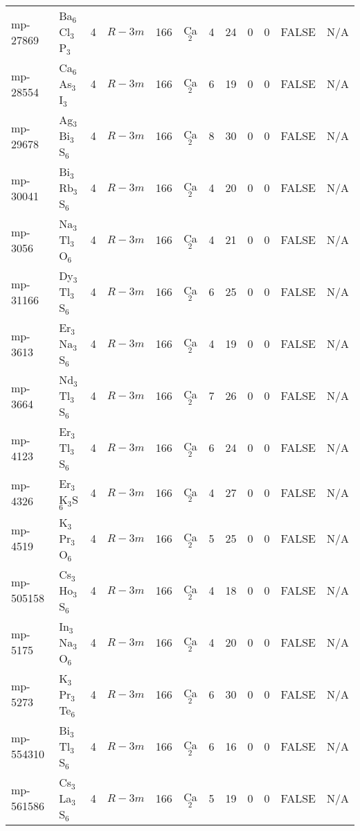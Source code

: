 {\begin{longtable}{llcccccccccc}
    mp-27869 & Ba$_{6}$Cl$_{3}$P$_{3}$ & 4     & $R-3m$ & 166   & Ca$_{2}$ & 4     & 24    & 0     & 0     & FALSE & N/A \\
    mp-28554 & Ca$_{6}$As$_{3}$I$_{3}$ & 4     & $R-3m$ & 166   & Ca$_{2}$ & 6     & 19    & 0     & 0     & FALSE & N/A \\
    mp-29678 & Ag$_{3}$Bi$_{3}$S$_{6}$ & 4     & $R-3m$ & 166   & Ca$_{2}$ & 8     & 30    & 0     & 0     & FALSE & N/A \\
    mp-30041 & Bi$_{3}$Rb$_{3}$S$_{6}$ & 4     & $R-3m$ & 166   & Ca$_{2}$ & 4     & 20    & 0     & 0     & FALSE & N/A \\
    mp-3056 & Na$_{3}$Tl$_{3}$O$_{6}$ & 4     & $R-3m$ & 166   & Ca$_{2}$ & 4     & 21    & 0     & 0     & FALSE & N/A \\
    mp-31166 & Dy$_{3}$Tl$_{3}$S$_{6}$ & 4     & $R-3m$ & 166   & Ca$_{2}$ & 6     & 25    & 0     & 0     & FALSE & N/A \\
    mp-3613 & Er$_{3}$Na$_{3}$S$_{6}$ & 4     & $R-3m$ & 166   & Ca$_{2}$ & 4     & 19    & 0     & 0     & FALSE & N/A \\
    mp-3664 & Nd$_{3}$Tl$_{3}$S$_{6}$ & 4     & $R-3m$ & 166   & Ca$_{2}$ & 7     & 26    & 0     & 0     & FALSE & N/A \\
    mp-4123 & Er$_{3}$Tl$_{3}$S$_{6}$ & 4     & $R-3m$ & 166   & Ca$_{2}$ & 6     & 24    & 0     & 0     & FALSE & N/A \\
    mp-4326 & Er$_{3}$K$_{3}$S$_{6}$ & 4     & $R-3m$ & 166   & Ca$_{2}$ & 4     & 27    & 0     & 0     & FALSE & N/A \\
    mp-4519 & K$_{3}$Pr$_{3}$O$_{6}$ & 4     & $R-3m$ & 166   & Ca$_{2}$ & 5     & 25    & 0     & 0     & FALSE & N/A \\
    mp-505158 & Cs$_{3}$Ho$_{3}$S$_{6}$ & 4     & $R-3m$ & 166   & Ca$_{2}$ & 4     & 18    & 0     & 0     & FALSE & N/A \\
    mp-5175 & In$_{3}$Na$_{3}$O$_{6}$ & 4     & $R-3m$ & 166   & Ca$_{2}$ & 4     & 20    & 0     & 0     & FALSE & N/A \\
    mp-5273 & K$_{3}$Pr$_{3}$Te$_{6}$ & 4     & $R-3m$ & 166   & Ca$_{2}$ & 6     & 30    & 0     & 0     & FALSE & N/A \\
    mp-554310 & Bi$_{3}$Tl$_{3}$S$_{6}$ & 4     & $R-3m$ & 166   & Ca$_{2}$ & 6     & 16    & 0     & 0     & FALSE & N/A \\
    mp-561586 & Cs$_{3}$La$_{3}$S$_{6}$ & 4     & $R-3m$ & 166   & Ca$_{2}$ & 5     & 19    & 0     & 0     & FALSE & N/A \\

\end{longtable}}
